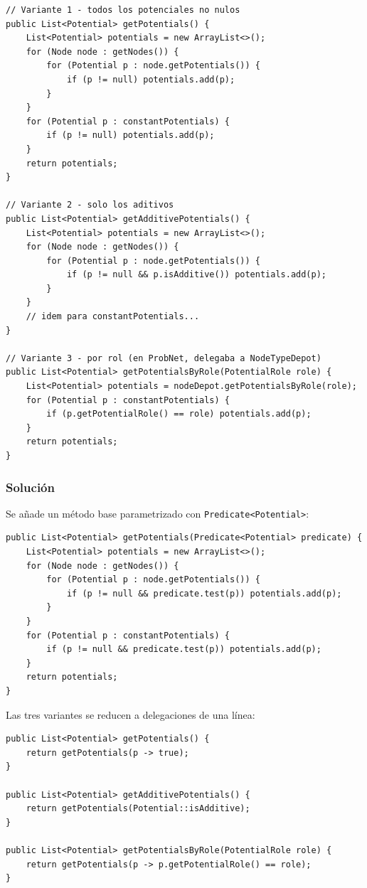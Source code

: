 \documentclass[11pt,a4paper]{article}
\newcommand{\code}[1]{\texttt{#1}}
\begin{document}
\begin{lstlisting}
// Variante 1 - todos los potenciales no nulos
public List<Potential> getPotentials() {
    List<Potential> potentials = new ArrayList<>();
    for (Node node : getNodes()) {
        for (Potential p : node.getPotentials()) {
            if (p != null) potentials.add(p);
        }
    }
    for (Potential p : constantPotentials) {
        if (p != null) potentials.add(p);
    }
    return potentials;
}

// Variante 2 - solo los aditivos
public List<Potential> getAdditivePotentials() {
    List<Potential> potentials = new ArrayList<>();
    for (Node node : getNodes()) {
        for (Potential p : node.getPotentials()) {
            if (p != null && p.isAdditive()) potentials.add(p);
        }
    }
    // idem para constantPotentials...
}

// Variante 3 - por rol (en ProbNet, delegaba a NodeTypeDepot)
public List<Potential> getPotentialsByRole(PotentialRole role) {
    List<Potential> potentials = nodeDepot.getPotentialsByRole(role);
    for (Potential p : constantPotentials) {
        if (p.getPotentialRole() == role) potentials.add(p);
    }
    return potentials;
}
\end{lstlisting}

\subsubsection*{Solución}

Se añade un método base parametrizado con \code{Predicate<Potential>}:

\begin{lstlisting}
public List<Potential> getPotentials(Predicate<Potential> predicate) {
    List<Potential> potentials = new ArrayList<>();
    for (Node node : getNodes()) {
        for (Potential p : node.getPotentials()) {
            if (p != null && predicate.test(p)) potentials.add(p);
        }
    }
    for (Potential p : constantPotentials) {
        if (p != null && predicate.test(p)) potentials.add(p);
    }
    return potentials;
}
\end{lstlisting}

Las tres variantes se reducen a delegaciones de una línea:

\begin{lstlisting}
public List<Potential> getPotentials() {
    return getPotentials(p -> true);
}

public List<Potential> getAdditivePotentials() {
    return getPotentials(Potential::isAdditive);
}

public List<Potential> getPotentialsByRole(PotentialRole role) {
    return getPotentials(p -> p.getPotentialRole() == role);
}
\end{lstlisting}
\end{document}
